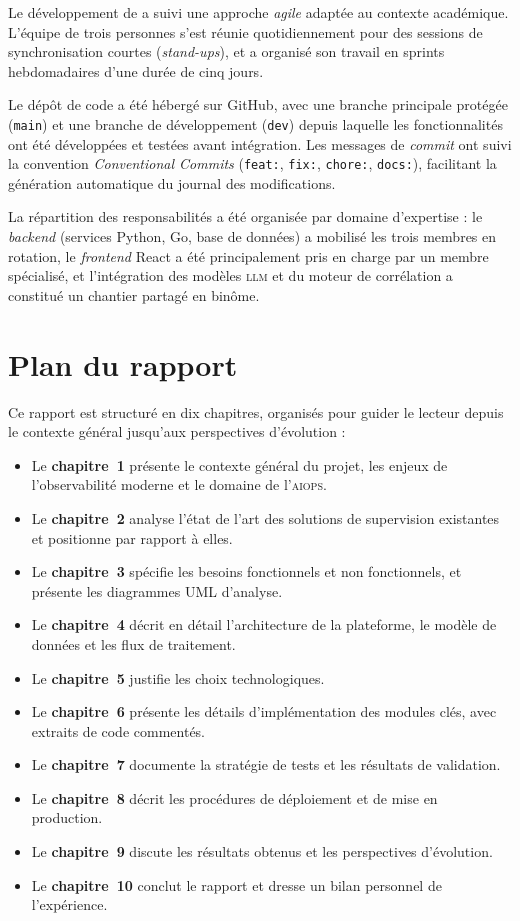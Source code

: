 Le développement de \caimp{} a suivi une approche \textit{agile} adaptée au
contexte académique. L'équipe de trois personnes s'est réunie quotidiennement pour
des sessions de synchronisation courtes (\textit{stand-ups}), et a organisé son
travail en sprints hebdomadaires d'une durée de cinq jours.

Le dépôt de code a été hébergé sur GitHub, avec une branche principale protégée
(\texttt{main}) et une branche de développement (\texttt{dev}) depuis laquelle
les fonctionnalités ont été développées et testées avant intégration. Les messages
de \textit{commit} ont suivi la convention \textit{Conventional Commits}
(\texttt{feat:}, \texttt{fix:}, \texttt{chore:}, \texttt{docs:}), facilitant la
génération automatique du journal des modifications.

La répartition des responsabilités a été organisée par domaine d'expertise :
le \textit{backend} (services Python, Go, base de données) a mobilisé les trois
membres en rotation, le \textit{frontend} React a été principalement pris en
charge par un membre spécialisé, et l'intégration des modèles \textsc{llm} et
du moteur de corrélation a constitué un chantier partagé en binôme.

\section{Plan du rapport}

Ce rapport est structuré en dix chapitres, organisés pour guider le lecteur
depuis le contexte général jusqu'aux perspectives d'évolution :

\begin{itemize}
  \item Le \textbf{chapitre~1} présente le contexte général du projet, les enjeux
    de l'observabilité moderne et le domaine de l'\textsc{aiops}.
  \item Le \textbf{chapitre~2} analyse l'état de l'art des solutions de supervision
    existantes et positionne \caimp{} par rapport à elles.
  \item Le \textbf{chapitre~3} spécifie les besoins fonctionnels et non fonctionnels,
    et présente les diagrammes UML d'analyse.
  \item Le \textbf{chapitre~4} décrit en détail l'architecture de la plateforme,
    le modèle de données et les flux de traitement.
  \item Le \textbf{chapitre~5} justifie les choix technologiques.
  \item Le \textbf{chapitre~6} présente les détails d'implémentation des modules
    clés, avec extraits de code commentés.
  \item Le \textbf{chapitre~7} documente la stratégie de tests et les résultats
    de validation.
  \item Le \textbf{chapitre~8} décrit les procédures de déploiement et de mise
    en production.
  \item Le \textbf{chapitre~9} discute les résultats obtenus et les perspectives
    d'évolution.
  \item Le \textbf{chapitre~10} conclut le rapport et dresse un bilan personnel
    de l'expérience.
\end{itemize}

